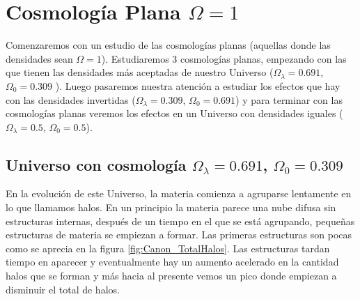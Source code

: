 \section[Cosmología Plana \texorpdfstring{$\Omega = 1$}{Omega = 1}]{Cosmología Plana \texorpdfstring{$\Omega = 1$}{Omega = 1}}

\noindent Comenzaremos con un estudio de las cosmologías planas (aquellas donde las densidades sean $\Omega = 1$). Estudiaremos 3 cosmologías planas, empezando con las que tienen las densidades más aceptadas de nuestro Universo ($\Omega_\lambda = 0.691$, $\Omega_0 = 0.309$  \cite{2020A&A...641A...1P}). Luego pasaremos nuestra atención a estudiar los efectos que hay con las densidades invertidas ($\Omega_\lambda = 0.309$, $\Omega_0 = 0.691$) y para terminar con las cosmologías planas veremos los efectos en un Universo con densidades iguales ($\Omega_\lambda = 0.5$, $\Omega_0 = 0.5$).

\subsection{Universo con cosmología  \texorpdfstring{$\Omega_\lambda = 0.691$, $\Omega_0 = 0.309$ }{Omega lambda = 0.691, Omega 0 = 0.309}  }

 En la evolución de este Universo, la materia comienza a agruparse lentamente en lo que llamamos halos. En un principio la materia parece una nube difusa sin estructuras internas, después de un tiempo en el que se está agrupando, pequeñas estructuras de materia se empiezan a formar. Las primeras estructuras son pocas como se aprecia en la figura \ref{fig:Canon_TotalHalos}. Las estructuras tardan tiempo en aparecer y eventualmente hay un aumento acelerado en la cantidad halos que se forman y más hacia al presente vemos un pico donde empiezan a disminuir el total de halos.

